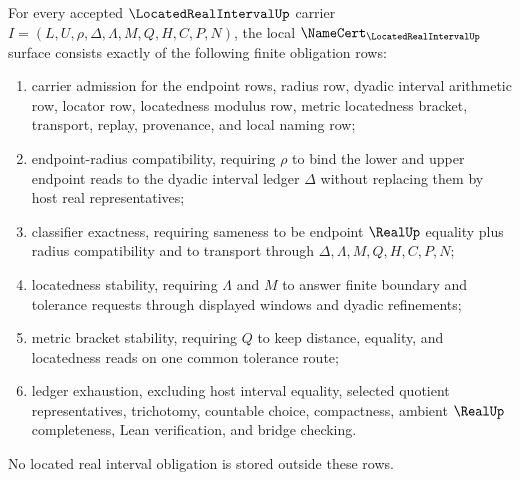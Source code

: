 \begin{theorem}
\label{thm:located-real-interval-namecert-obligations}
For every accepted $\LocatedRealIntervalUp$ carrier $I=(L,U,\rho,\Delta,\Lambda,M,Q,H,C,P,N)$, the local $\NameCert_{\LocatedRealIntervalUp}$ surface consists exactly of the following finite obligation rows:
\begin{enumerate}
\item carrier admission for the endpoint rows, radius row, dyadic interval arithmetic row, locator row, locatedness modulus row, metric locatedness bracket, transport, replay, provenance, and local naming row;
\item endpoint-radius compatibility, requiring $\rho$ to bind the lower and upper endpoint reads to the dyadic interval ledger $\Delta$ without replacing them by host real representatives;
\item classifier exactness, requiring sameness to be endpoint $\RealUp$ equality plus radius compatibility and to transport through $\Delta,\Lambda,M,Q,H,C,P,N$;
\item locatedness stability, requiring $\Lambda$ and $M$ to answer finite boundary and tolerance requests through displayed windows and dyadic refinements;
\item metric bracket stability, requiring $Q$ to keep distance, equality, and locatedness reads on one common tolerance route;
\item ledger exhaustion, excluding host interval equality, selected quotient representatives, trichotomy, countable choice, compactness, ambient $\RealUp$ completeness, Lean verification, and bridge checking.
\end{enumerate}
No located real interval obligation is stored outside these rows.
\end{theorem}

